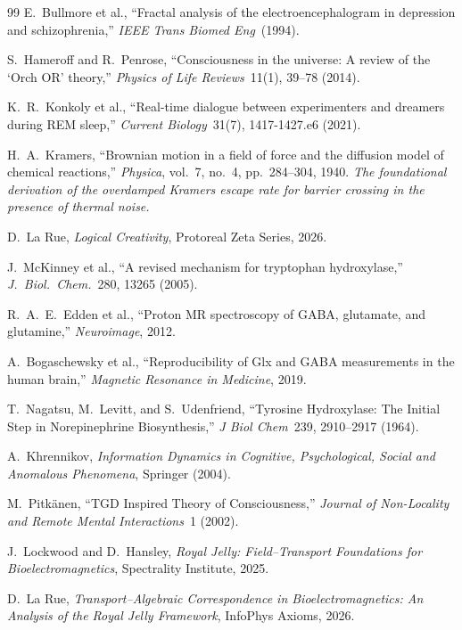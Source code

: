 \begin{thebibliography}{99}
E.~Bullmore et al., ``Fractal analysis of the electroencephalogram in depression and schizophrenia,'' \emph{IEEE Trans Biomed Eng}\ (1994).

S.~Hameroff and R.~Penrose, ``Consciousness in the universe: A review of the `Orch OR' theory,'' \emph{Physics of Life Reviews}\ 11(1), 39--78 (2014).

K.~R.~Konkoly et al., ``Real-time dialogue between experimenters and dreamers during REM sleep,'' \emph{Current Biology}\ 31(7), 1417-1427.e6 (2021).

H.~A.~Kramers,
``Brownian motion in a field of force and the diffusion model of chemical reactions,''
\emph{Physica}, vol.~7, no.~4, pp.~284--304, 1940.
\textit{The foundational derivation of the overdamped Kramers escape rate for barrier crossing in the presence of thermal noise.}

D.~La Rue, \emph{Logical Creativity}, Protoreal Zeta Series, 2026.

J.~McKinney et al., ``A revised mechanism for tryptophan hydroxylase,'' \emph{J.~Biol.~Chem.}\ 280, 13265 (2005).

R.~A.~E.~Edden et al., ``Proton MR spectroscopy of GABA, glutamate, and glutamine,'' \emph{Neuroimage}, 2012.

A.~Bogaschewsky et al., ``Reproducibility of Glx and GABA measurements in the human brain,'' \emph{Magnetic Resonance in Medicine}, 2019.

T.~Nagatsu, M.~Levitt, and S.~Udenfriend, ``Tyrosine Hydroxylase: The Initial Step in Norepinephrine Biosynthesis,'' \emph{J Biol Chem}\ 239, 2910--2917 (1964).

A.~Khrennikov, \emph{Information Dynamics in Cognitive, Psychological, Social and Anomalous Phenomena}, Springer (2004).

M.~Pitk\"anen, ``TGD Inspired Theory of Consciousness,'' \emph{Journal of Non-Locality and Remote Mental Interactions}\ 1 (2002).

J.~Lockwood and D.~Hansley, \emph{Royal Jelly: Field--Transport Foundations for Bioelectromagnetics}, Spectrality Institute, 2025.

D.~La Rue, \emph{Transport--Algebraic Correspondence in Bioelectromagnetics: An Analysis of the Royal Jelly Framework}, InfoPhys Axioms, 2026.


\end{thebibliography}
